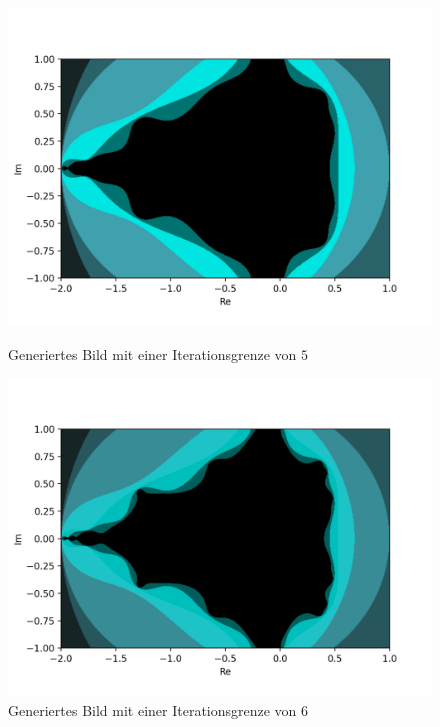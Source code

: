 \begin{figure}[H]
\centering
\begin{minipage}[t]{0.48\textwidth}
  \centering
  \includegraphics[width=\linewidth]{images/maxBorder/5}
  \vspace*{-8ex}
  \caption{Generiertes Bild mit einer Iterationsgrenze von $5$}
  \label{app:8.5}
\end{minipage}%
\hspace{2ex}
\begin{minipage}[t]{0.48\textwidth}
  \centering
  \includegraphics[width=\linewidth]{images/maxBorder/6}
  \vspace*{-8ex}
  \caption{Generiertes Bild mit einer Iterationsgrenze von $6$}

\end{minipage}
\end{figure}
